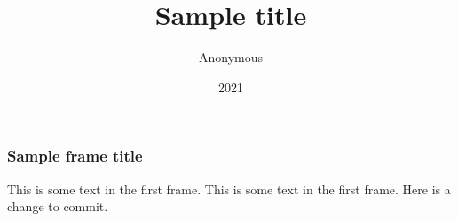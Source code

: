 \documentclass{beamer}
\title{Sample title}
\author{Anonymous}
\institute{Overleaf}
\date{2021}
\begin{document}
\frame{\titlepage}

\begin{frame}

\frametitle{Sample frame title}

This is some text in the first frame. This is some text in the first frame. 
Here is a change to commit.
\end{frame}
\end{document}
